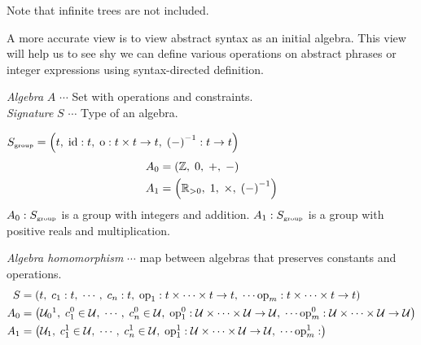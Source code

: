 \begin{enumcirc}
\begin{center}
	\end{center}
	Note that infinite trees are not included.
	\item
	A more accurate view is to view abstract syntax as an initial algebra.
	This view will help us to see shy we can define various operations on abstract
	phrases or integer expressions using syntax-directed definition.

	\item
	\emph{Algebra} $A$ $\cdots$ Set with operations and constraints. \\
	\emph{Signature} $S$ $\cdots$ Type of an algebra.
	\begin{exampletab}
		$S_{\textrm{\tiny group}} = \left( t,\; \textrm{id}: t ,\; \textrm{o} : t \times t \rightarrow t,\; \left( - \right)^{-1} : t \rightarrow t \right)$
		\begin{align*}
			A_0 & = \left( \mathbb{Z},\; 0,\; +,\; - \right)                         \\
			A_1 & = \left( \mathbb{R}_{>0} ,\; 1,\; \times,\; \left( - \right)^{-1} \right)
		\end{align*}
		$A_0: S_{\textrm{\tiny group}}$ is a group with integers and addition.
		$A_1: S_{\textrm{\tiny group}}$ is a group with positive reals and multiplication.
	\end{exampletab}
	\newpage
	\item
	\emph{Algebra homomorphism} $\cdots$ map between algebras that preserves
	constants and operations.
	\begin{align*}
		S   & = \prths{
			t,\; c_1 : t,\; \cdots ,\; c_n : t ,\;
			\textrm{op}_1 : t \times \cdots \times t \rightarrow t ,\; \cdots
			\textrm{op}_m : t \times \cdots \times t \rightarrow t
		}
		\\
		A_0 & = \prths{
			\mathcal{U}_0\footnotemark,\;
			c_1^0 \in \mathcal{U} ,\;
			\cdots ,\;
			c_n^0 \in \mathcal{U} ,\;
			\textrm{op}_1^0 :
			\mathcal{U} \times \cdots \times \mathcal{U} \rightarrow \mathcal{U},\; \cdots
			\textrm{op}_m^0 :
			\mathcal{U} \times \cdots \times \mathcal{U} \rightarrow \mathcal{U}
		}
		\\
		A_1 & = \prths{
			\mathcal{U}_1,\;
			c_1^1 \in \mathcal{U} ,\;
			\cdots ,\;
			c_n^1 \in \mathcal{U} ,\;
			\textrm{op}_1^1 :
			\mathcal{U} \times \cdots \times \mathcal{U} \rightarrow \mathcal{U},\; \cdots
			\textrm{op}_m^1 :
}
\end{align*}
\end{enumcirc}
